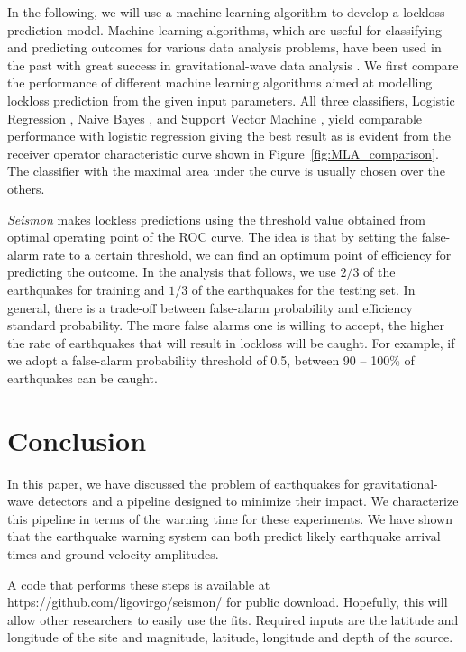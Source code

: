 \documentclass[twocolumn, prl, superscriptaddress]{revtex4}
\begin{document}
In the following, we will use a machine learning algorithm to develop a lockloss prediction model. Machine learning algorithms, which are useful for classifying and predicting outcomes for various data analysis problems, have been used in the past with great success in gravitational-wave data analysis \cite{BiBl2013,KyHa2015}. We first compare the performance of different machine learning algorithms aimed at modelling lockloss prediction from the given input parameters.  All three classifiers, Logistic Regression \cite{mccullagh_glm}, Naive Bayes \cite{John_NaiveBayes}, and Support Vector Machine \cite{Burges_SVM}, yield comparable performance with logistic regression giving the best result as is evident from the receiver operator characteristic curve shown in Figure~\ref{fig:MLA_comparison}. 
The classifier with the maximal area under the curve is usually chosen over the others. 

\emph{Seismon} makes lockless predictions using the threshold value obtained from optimal operating point of the ROC curve. 	
The idea is that by setting the false-alarm rate to a certain threshold, we can find an optimum point of efficiency for predicting the outcome. In the analysis that follows, we use $2/3$ of the earthquakes for training and  $1/3$ of the earthquakes for the testing set. 
In general, there is a trade-off between false-alarm probability and efficiency standard probability. The more false alarms one is willing to accept, the higher the rate of earthquakes that will result in lockloss will be caught. For example, if we adopt a false-alarm probability threshold of 0.5, between 90 -- 100\% of earthquakes can be caught.

\section{Conclusion}
\label{sec:conclusions}

In this paper, we have discussed the problem of earthquakes for gravitational-wave detectors and a pipeline designed to minimize their impact. 
We characterize this pipeline in terms of the warning time for these experiments.
We have shown that the earthquake warning system can both predict likely earthquake arrival times and ground velocity amplitudes. 

A code that performs these steps is available at https://github.com/ligovirgo/seismon/ for public download. Hopefully, this will allow other researchers to easily use the fits. Required inputs are the latitude and longitude of the site and magnitude, latitude, longitude and depth of the source.
\end{document}

